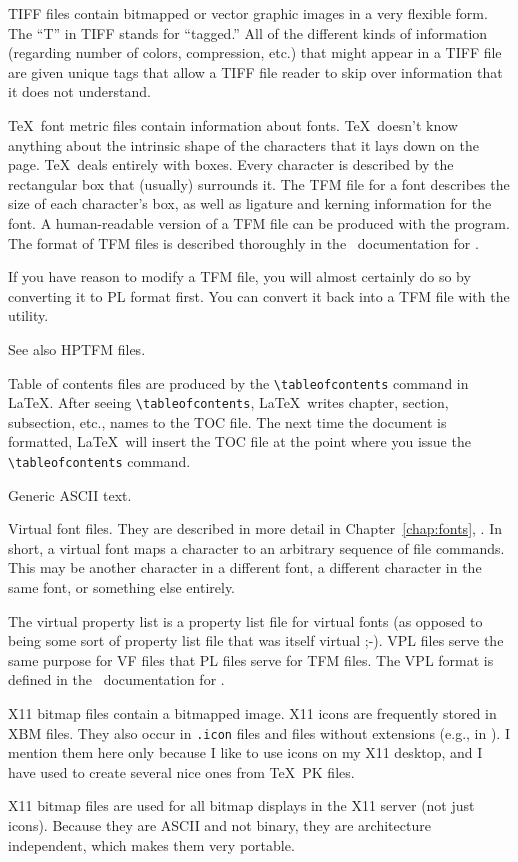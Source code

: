 \begin{iplist}{.25in}
\extitem [tiff] TIFF files contain bitmapped or vector graphic images in a 
very flexible form.  The ``T'' in TIFF stands for ``tagged.''  All of the
different kinds of information (regarding number of colors, compression,
etc.) that might appear in a TIFF file are given unique tags that allow
a TIFF file reader to skip over information that it does not 
understand.

\extitem [tfm] \TeX\ font metric files contain information about fonts.
\TeX\ doesn't know anything about the intrinsic shape of the
characters that it lays down on the page.  \TeX\ deals entirely with boxes.
Every character is described by the rectangular box that (usually)
surrounds it.  The TFM file for a font describes the size of each
character's box, as well as ligature and kerning information for the font.
A human-readable version of a
TFM file can be produced with the  program.  The format of
TFM files is described thoroughly in the \web\ documentation for
. 

If you have reason to modify a TFM file, you will almost certainly do
so by converting it to PL format first.  You can convert it back into a TFM
file with the  utility.

See also HPTFM files.

\extitem [toc] Table of contents files are produced by the
\verb|\tableofcontents| command in \LaTeX.  After seeing
\verb|\tableofcontents|, \LaTeX\ writes chapter, section, subsection, etc.,
names to the TOC file.  The next time the document is formatted, \LaTeX\ will
insert the TOC file at the point where you issue the \verb|\tableofcontents|
command.

\extitem [txt] Generic ASCII text.

\extitem [vf]  Virtual font files.  They are described in more detail in
Chapter~\ref{chap:fonts}, {\it{}}.  In short, a virtual
font maps a character to an arbitrary sequence of  file commands.
This may be another character in a different font, a different character
in the same font, or something else entirely.

\extitem [vpl] The virtual property list is a property list file for virtual
fonts (as opposed to being some sort of property list file that was itself
virtual ;-).  VPL files serve the same purpose for VF files that PL files
serve for TFM files.  The VPL format is defined in the \web\ documentation
for .  

\extitem [xbm] X11 bitmap files contain a bitmapped image. X11 icons are
frequently stored in XBM files.  They also occur in {\tt .icon} files and
files without extensions (e.g., in ).  I mention them here only because I like to use 
icons on my X11 desktop, and I have used  to create several 
nice ones from \TeX\ PK files.

X11 bitmap files are used for all bitmap displays in the X11 server
(not just icons).  Because they are ASCII and not binary, they are
architecture independent, which makes them very portable.\par

\end{iplist}
